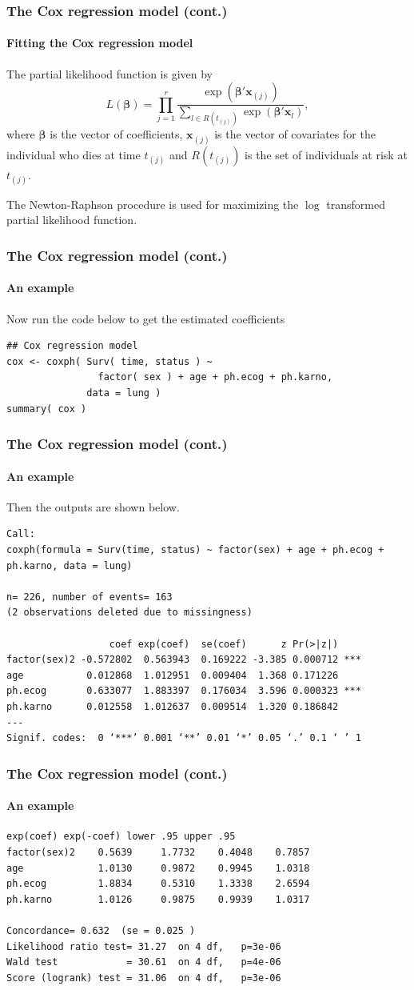 \documentclass{beamer}
\begin{document}
	\begin{frame}
		\frametitle{The Cox regression model (cont.)}
		\framesubtitle{Fitting the Cox regression model}
		The partial likelihood function is given by 
		\[ L( \pmb{ \beta } ) = \prod_{ j = 1 }^{ r } \frac{ \exp( \pmb{ \beta }'\pmb{ x }_{ ( j ) } ) }{ \sum_{ l \in R( t_{ ( j ) } ) } \exp ( \pmb{ \beta }'\pmb{ x }_l ) }, \]
		where $\pmb{ \beta }$ is the vector of coefficients, $\pmb{ x }_{ ( j ) }$ is the vector of covariates for the individual who dies at time $t_{ ( j ) }$ and $R( t_{ ( j ) } )$ is the set of individuals at risk at $t_{ ( j ) }$.
		
		The Newton-Raphson procedure is used for maximizing the $\log$ transformed partial likelihood function.
	\end{frame}
	
	\begin{frame}[fragile]
		\frametitle{The Cox regression model (cont.)}
		\framesubtitle{An example}
		Now run the code below to get the estimated coefficients
		\begin{Verbatim}
## Cox regression model
cox <- coxph( Surv( time, status ) ~ 
                factor( sex ) + age + ph.ecog + ph.karno,
              data = lung )
summary( cox )
		\end{Verbatim}
	\end{frame}

	\begin{frame}[fragile]
		\frametitle{The Cox regression model (cont.)}
		\framesubtitle{An example}
		Then the outputs are shown below.
		\begin{Verbatim}[fontsize=\small]
Call:
coxph(formula = Surv(time, status) ~ factor(sex) + age + ph.ecog + 
ph.karno, data = lung)

n= 226, number of events= 163 
(2 observations deleted due to missingness)

                  coef exp(coef)  se(coef)      z Pr(>|z|)    
factor(sex)2 -0.572802  0.563943  0.169222 -3.385 0.000712 ***
age           0.012868  1.012951  0.009404  1.368 0.171226    
ph.ecog       0.633077  1.883397  0.176034  3.596 0.000323 ***
ph.karno      0.012558  1.012637  0.009514  1.320 0.186842    
---
Signif. codes:  0 ‘***’ 0.001 ‘**’ 0.01 ‘*’ 0.05 ‘.’ 0.1 ‘ ’ 1
		\end{Verbatim}
	\end{frame}
	
	\begin{frame}[fragile]
		\frametitle{The Cox regression model (cont.)}
		\framesubtitle{An example}
		\begin{Verbatim}[fontsize=\small]
             exp(coef) exp(-coef) lower .95 upper .95
factor(sex)2    0.5639     1.7732    0.4048    0.7857
age             1.0130     0.9872    0.9945    1.0318
ph.ecog         1.8834     0.5310    1.3338    2.6594
ph.karno        1.0126     0.9875    0.9939    1.0317

Concordance= 0.632  (se = 0.025 )
Likelihood ratio test= 31.27  on 4 df,   p=3e-06
Wald test            = 30.61  on 4 df,   p=4e-06
Score (logrank) test = 31.06  on 4 df,   p=3e-06
		\end{Verbatim}
	\end{frame}
	
\end{document}

